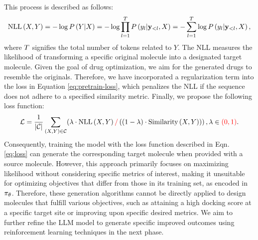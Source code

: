 This process is described as follows:
\begin{align}\label{eq:pretrain-loss}
    \text{NLL} \left( {X,Y} \right)  =  - \log P \left( {Y|X} \right)  = - \log \prod_{l=1}^{T} P \left( {y_{l}|\mathbf{y}_{<l},X} \right)  
    =-\sum_{l=1}^{T} \log P \left( {y_{l}|\mathbf{y}_{<l},X} \right) ,
\end{align}
where $T$ signifies the total number of tokens related to $Y$. The NLL measures the likelihood of transforming a specific original molecule into a designated target molecule. 
Given the goal of drug optimization, we aim for the generated drugs to resemble the originals. Therefore, we have incorporated a regularization term into the loss in Equation \eqref{eq:pretrain-loss}, which penalizes the NLL if the sequence does not adhere to a specified similarity metric.
Finally, we propose the following loss function:
\begin{align}\label{eq:loss}
    \mathcal{L}=
    \frac{1}{|\mathcal{C}|}\sum_{ \left( {X,Y} \right) \in \mathcal{C}}
    (\lambda\cdot\text{NLL} \left( {X,Y} \right)  {\color{red} /}  \left( {  \left( {1-\lambda} \right) \cdot \text{Similarity} \left( { X, Y} \right) )} \right) , \lambda\in {\color{red} \ensuremath{ \left( {0,1} \right) }}.
\end{align}
Consequently, 
training the model with the loss function described in Eqn. \eqref{eq:loss} can generate the corresponding target molecule when provided with a source molecule.
However, this approach primarily focuses on maximizing likelihood without considering specific metrics of interest, making it unsuitable for optimizing objectives that differ from those in its training set, as encoded in $\pi_{\theta}$. 
Therefore, these generation algorithms cannot be directly applied to design molecules that fulfill various objectives, such as attaining a high docking score at a specific target site or improving upon specific desired metrics.
We aim to further refine the LLM model to generate specific improved outcomes using reinforcement learning techniques in the next phase.




\fix{































}




